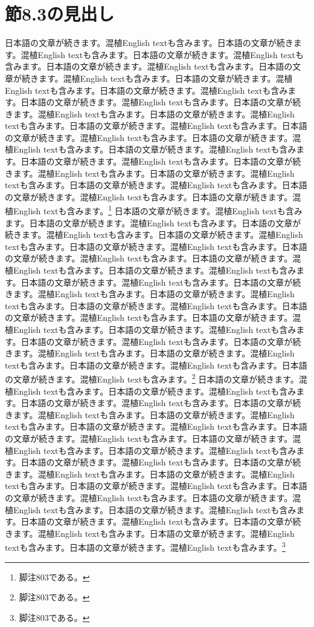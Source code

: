 \documentclass[pdflatex,book]{jlreq}
\begin{document}
\section{節8.3の見出し}
日本語の文章が続きます。混植English textも含みます。日本語の文章が続きます。混植English textも含みます。日本語の文章が続きます。混植English textも含みます。日本語の文章が続きます。混植English textも含みます。日本語の文章が続きます。混植English textも含みます。日本語の文章が続きます。混植English textも含みます。日本語の文章が続きます。混植English textも含みます。日本語の文章が続きます。混植English textも含みます。日本語の文章が続きます。混植English textも含みます。日本語の文章が続きます。混植English textも含みます。日本語の文章が続きます。混植English textも含みます。日本語の文章が続きます。混植English textも含みます。日本語の文章が続きます。混植English textも含みます。日本語の文章が続きます。混植English textも含みます。日本語の文章が続きます。混植English textも含みます。日本語の文章が続きます。混植English textも含みます。日本語の文章が続きます。混植English textも含みます。日本語の文章が続きます。混植English textも含みます。日本語の文章が続きます。混植English textも含みます。日本語の文章が続きます。混植English textも含みます。\footnote{脚注803である。}
日本語の文章が続きます。混植English textも含みます。日本語の文章が続きます。混植English textも含みます。日本語の文章が続きます。混植English textも含みます。日本語の文章が続きます。混植English textも含みます。日本語の文章が続きます。混植English textも含みます。日本語の文章が続きます。混植English textも含みます。日本語の文章が続きます。混植English textも含みます。日本語の文章が続きます。混植English textも含みます。日本語の文章が続きます。混植English textも含みます。日本語の文章が続きます。混植English textも含みます。日本語の文章が続きます。混植English textも含みます。日本語の文章が続きます。混植English textも含みます。日本語の文章が続きます。混植English textも含みます。日本語の文章が続きます。混植English textも含みます。日本語の文章が続きます。混植English textも含みます。日本語の文章が続きます。混植English textも含みます。日本語の文章が続きます。混植English textも含みます。日本語の文章が続きます。混植English textも含みます。日本語の文章が続きます。混植English textも含みます。日本語の文章が続きます。混植English textも含みます。\footnote{脚注803である。}
日本語の文章が続きます。混植English textも含みます。日本語の文章が続きます。混植English textも含みます。日本語の文章が続きます。混植English textも含みます。日本語の文章が続きます。混植English textも含みます。日本語の文章が続きます。混植English textも含みます。日本語の文章が続きます。混植English textも含みます。日本語の文章が続きます。混植English textも含みます。日本語の文章が続きます。混植English textも含みます。日本語の文章が続きます。混植English textも含みます。日本語の文章が続きます。混植English textも含みます。日本語の文章が続きます。混植English textも含みます。日本語の文章が続きます。混植English textも含みます。日本語の文章が続きます。混植English textも含みます。日本語の文章が続きます。混植English textも含みます。日本語の文章が続きます。混植English textも含みます。日本語の文章が続きます。混植English textも含みます。日本語の文章が続きます。混植English textも含みます。日本語の文章が続きます。混植English textも含みます。日本語の文章が続きます。混植English textも含みます。日本語の文章が続きます。混植English textも含みます。\footnote{脚注803である。}
\end{document}
